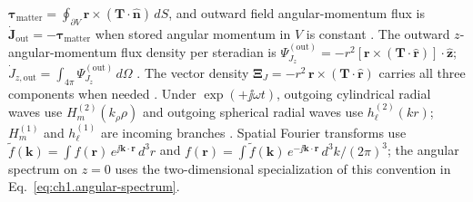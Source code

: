 $\boldsymbol{\tau}_{\mathrm{matter}}=\oint_{\partial V}\mathbf{r}\times(\mathbf{T}\cdot\hat{\mathbf{n}})\,dS$,
and outward field angular-momentum flux is
$\dot{\mathbf{J}}_{\mathrm{out}}=-\boldsymbol{\tau}_{\mathrm{matter}}$
when stored angular momentum in $V$ is constant \cite{stratton1941,beth1936}.
The outward $z$-angular-momentum flux density per steradian is
$\Psi_{J_z}^{\mathrm{(out)}}=-r^2[\mathbf{r}\times(\mathbf{T}\cdot\hat{\mathbf{r}})]\cdot\hat{\mathbf{z}}$;
$\dot J_{z,\mathrm{out}}=\int_{4\pi}\Psi_{J_z}^{\mathrm{(out)}}\,d\Omega$ \cite{stratton1941}.
The vector density $\boldsymbol{\Xi}_J=-r^2\,\mathbf{r}\times(\mathbf{T}\cdot\hat{\mathbf{r}})$ carries all three components when needed \cite{beth1936}.
Under $\exp(+\jj\omega t)$, outgoing cylindrical radial waves use $H_m^{(2)}(k_\rho\rho)$ and outgoing spherical radial waves use $h_\ell^{(2)}(kr)$; $H_m^{(1)}$ and $h_\ell^{(1)}$ are incoming branches \cite{stratton1941,harrington2001}.
Spatial Fourier transforms use
$\tilde{f}(\mathbf{k})=\int f(\mathbf{r})\,e^{\jj\mathbf{k}\cdot\mathbf{r}}\,d^3r$
and
$f(\mathbf{r})=\int \tilde{f}(\mathbf{k})\,e^{-\jj\mathbf{k}\cdot\mathbf{r}}\,d^3k/(2\pi)^3$;
the angular spectrum on $z=0$ uses the two-dimensional specialization of this convention in Eq.~\eqref{eq:ch1.angular-spectrum}.

\noindent{}
